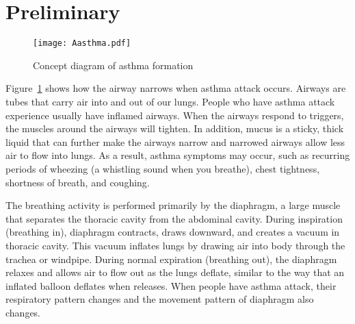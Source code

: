 \section{Preliminary} \label{sec.preliminary}

\begin{figure}[h!]
\centering
\texttt{[image: Aasthma.pdf]}
\caption{Concept diagram of asthma formation~\cite{NH}}
\label{fig.Asthma}
\end{figure}
Figure~\ref{fig.Asthma} shows how the airway narrows when asthma attack occurs. Airways are tubes that carry air into and out of our lungs. People who have asthma attack experience usually have inflamed airways. When the airways respond to triggers, the muscles around the airways will tighten. In addition, mucus is a sticky, thick liquid that can further make the airways narrow and narrowed airways allow less air to flow into lungs. As a result, asthma symptoms may occur, such as recurring periods of wheezing (a whistling sound when you breathe), chest tightness, shortness of breath, and coughing.

The breathing activity is performed primarily by the diaphragm, a large muscle that separates the thoracic cavity from the abdominal cavity. During inspiration (breathing in), diaphragm contracts, draws downward, and creates a vacuum in thoracic cavity. This vacuum inflates lungs by drawing air into body through the trachea or windpipe. During normal expiration (breathing out), the diaphragm relaxes and allows air to flow out as the lungs deflate, similar to the way that an inflated balloon deflates when releases. When people have asthma attack, their respiratory pattern changes and the movement pattern of diaphragm also changes.

